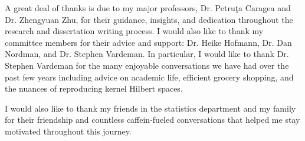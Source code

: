 A great deal of thanks is due to my major professors, Dr. Petru\c{t}a Caragea and Dr. Zhengyuan Zhu, for their guidance, insights, and dedication throughout the research and dissertation writing process. I would also like to thank my committee members for their advice and support: Dr. Heike Hofmann, Dr. Dan Nordman, and Dr. Stephen Vardeman. In particular, I would like to thank Dr. Stephen Vardeman for the many enjoyable conversations we have had over the past few years including advice on academic life, efficient grocery shopping, and the nuances of reproducing kernel Hilbert spaces. 

I would also like to thank my friends in the statistics department and my family for their friendship and countless caffein-fueled conversations that helped me stay motivated throughout this journey. 

